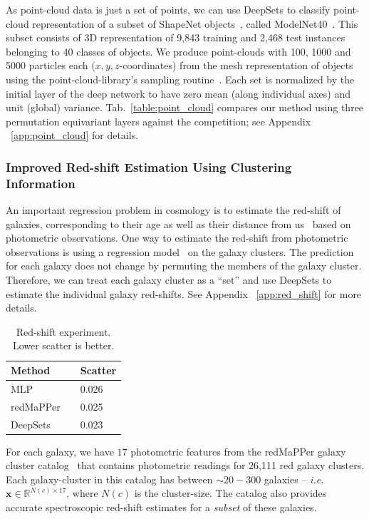 \documentclass{article}
\newcommand{\refapp}[1]{Appendix ~\ref{#1}}
\newcommand{\reftab}[1]{Tab.~\ref{#1}}
\newcommand{\xx}[0]{\ensuremath{\mathbf{x}}}
\newcommand{\latinphrase}[1]{\emph{#1}}    %
\newcommand{\ie}{\latinphrase{i.e.}\xspace}
\newcommand{\deepsets}{DeepSets\xspace}
\begin{document}
As point-cloud data is just a set of points, we can use \deepsets to classify point-cloud representation of a subset of ShapeNet objects~\cite{chang2015shapenet}, called ModelNet40~\cite{wu20153d}. This subset consists of 3D representation of 9,843 training and 2,468 test instances belonging to 40 classes of objects. We produce point-clouds with  100, 1000 and 5000 particles each ($x,y,z$-coordinates) from the mesh representation of objects using the point-cloud-library's sampling routine~\cite{Rusu_ICRA2011_PCL}. Each set is normalized by the initial layer of the deep network to have zero mean (along individual axes) and unit (global) variance. \reftab{table:point_cloud} compares our method using three permutation equivariant layers against the competition; see \refapp{app:point_cloud} for details.

\subsubsection{Improved Red-shift Estimation Using Clustering Information}\label{sec:galaxy}
An important regression problem in cosmology is to estimate the red-shift of galaxies, corresponding to their age as well as their distance from us~\cite{binney1998galactic} based on photometric observations. One way to estimate the red-shift from photometric observations is using a regression model~\cite{connolly1995slicing} on the galaxy clusters. The prediction for each galaxy does not change by permuting the members of the galaxy cluster. Therefore, we can treat each galaxy cluster as a ``set'' and use \deepsets to estimate the individual galaxy red-shifts. See \refapp{app:red_shift} for more details.

\begin{table}
\vspace{-4mm}
\centering
\small
\begin{tabular}{lll}
\toprule
Method && Scatter \\
\midrule
MLP && 0.026 \\
redMaPPer && 0.025 \\
\deepsets && 0.023 \\
\bottomrule
\end{tabular}
\caption{\small Red-shift experiment. Lower scatter is better.}
\label{tbl:galaxy}
\vspace{-4mm}
\end{table} 
For each galaxy, we have $17$ photometric features from the redMaPPer galaxy cluster catalog~\cite{rozo2014redmapper} that contains photometric readings for 26,111 red galaxy clusters. Each galaxy-cluster in this catalog has between $\sim 20-300$ galaxies -- \ie $\xx \in \mathbb{R}^{N(c) \times 17}$, where $N(c)$ is the cluster-size. The catalog also provides accurate spectroscopic red-shift estimates for a \textit{subset} of these galaxies.
\end{document}
